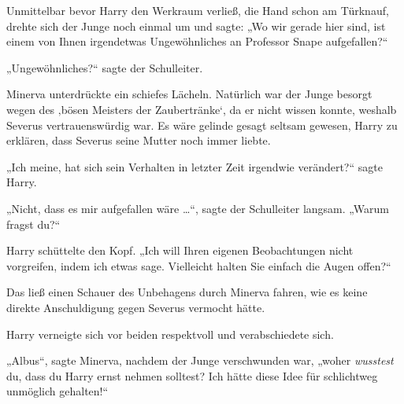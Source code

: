 Unmittelbar bevor Harry den Werkraum verließ, die Hand schon am Türknauf, drehte sich der Junge noch einmal um und sagte:
„Wo wir gerade hier sind, ist einem von Ihnen irgendetwas Ungewöhnliches an Professor Snape aufgefallen?“

„Ungewöhnliches?“ sagte der Schulleiter.

Minerva unterdrückte ein schiefes Lächeln. Natürlich war der Junge besorgt wegen des ‚bösen Meisters der Zaubertränke‘, da er nicht wissen konnte, weshalb Severus vertrauenswürdig war. Es wäre gelinde gesagt seltsam gewesen, Harry zu erklären, dass Severus seine Mutter noch immer liebte.

„Ich meine, hat sich sein Verhalten in letzter Zeit irgendwie verändert?“ sagte Harry.

„Nicht, dass es mir aufgefallen wäre …“, sagte der Schulleiter langsam.
„Warum fragst du?“

Harry schüttelte den Kopf.
„Ich will Ihren eigenen Beobachtungen nicht vorgreifen, indem ich etwas sage. Vielleicht halten Sie einfach die Augen offen?“

Das ließ einen Schauer des Unbehagens durch Minerva fahren, wie es keine direkte Anschuldigung gegen Severus vermocht hätte.

Harry verneigte sich vor beiden respektvoll und verabschiedete sich.

\later

„Albus“, sagte Minerva, nachdem der Junge verschwunden war, „woher \emph{wusstest} du, dass du Harry ernst nehmen solltest? Ich hätte diese Idee für schlichtweg unmöglich gehalten!“

